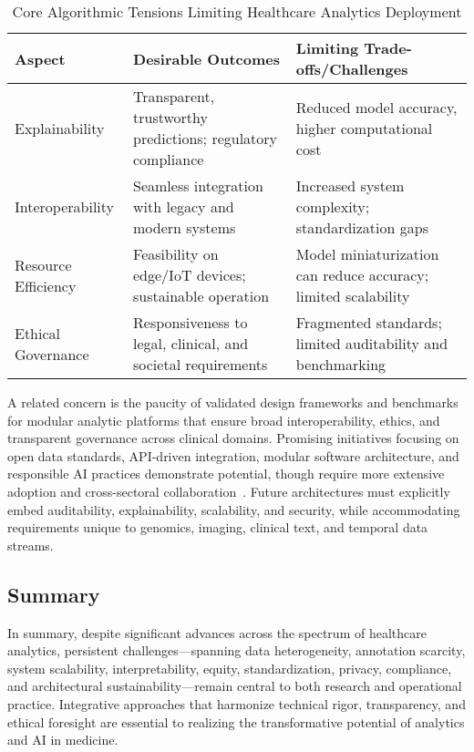 \begin{table*}[htbp]
\centering
\caption{Core Algorithmic Tensions Limiting Healthcare Analytics Deployment}
\label{tab:algorithmic_tensions}
\begin{adjustbox}{max width=\textwidth}
\begin{tabular}{lll}
\toprule
\textbf{Aspect} & \textbf{Desirable Outcomes} & \textbf{Limiting Trade-offs/Challenges} \\
\midrule
Explainability & Transparent, trustworthy predictions; regulatory compliance & Reduced model accuracy, higher computational cost\\
Interoperability & Seamless integration with legacy and modern systems & Increased system complexity; standardization gaps\\
Resource Efficiency & Feasibility on edge/IoT devices; sustainable operation & Model miniaturization can reduce accuracy; limited scalability \\
Ethical Governance & Responsiveness to legal, clinical, and societal requirements & Fragmented standards; limited auditability and benchmarking\\
\bottomrule
\end{tabular}
\end{adjustbox}
\end{table*}

A related concern is the paucity of validated design frameworks and benchmarks for modular analytic platforms that ensure broad interoperability, ethics, and transparent governance across clinical domains. Promising initiatives focusing on open data standards, API-driven integration, modular software architecture, and responsible AI practices demonstrate potential, though require more extensive adoption and cross-sectoral collaboration~\cite{ref7, ref24, ref30, ref44, ref45, ref46, ref49, ref50, ref61, ref63, ref64, ref65, ref70, ref71, ref72, ref73, ref74, ref75, ref76, ref77, ref78, ref80, ref84, ref106, ref107}. Future architectures must explicitly embed auditability, explainability, scalability, and security, while accommodating requirements unique to genomics, imaging, clinical text, and temporal data streams.

\subsection{Summary}

In summary, despite significant advances across the spectrum of healthcare analytics, persistent challenges—spanning data heterogeneity, annotation scarcity, system scalability, interpretability, equity, standardization, privacy, compliance, and architectural sustainability—remain central to both research and operational practice. Integrative approaches that harmonize technical rigor, transparency, and ethical foresight are essential to realizing the transformative potential of analytics and AI in medicine.

